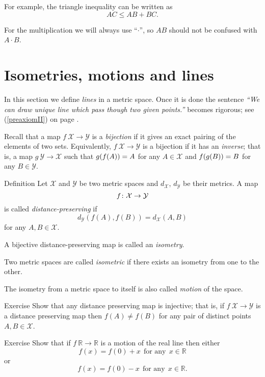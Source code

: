 For example, the triangle inequality can be written as 
$$AC\le AB+BC.$$

For the multiplication we will always use ``$\cdot$'',
so $AB$ should not be confused with $A\cdot B$.

\section*{Isometries, motions and lines}

In this section we define {}\emph{lines} in a metric space.
Once it is done the sentence  {}\emph{``We can draw unique line which pass though two given points.''} becomes rigorous; see (\ref{preaxiomII}) on page \pageref{preaxiomII}. 

Recall that a map $f\:\mathcal{X}\to\mathcal{Y}$
is a \emph{bijection} 
if it gives an exact pairing of the elements of two sets.
Equivalently, $f\:\mathcal{X}\to\mathcal{Y}$ is a bijection if it has an \emph{inverse};
that is, a map $g\:\mathcal{Y}\to\mathcal{X}$
such that 
$g(f(A))\z=A$   for any $A\in\mathcal{X}$
and
$f(g(B))\z=B$ for any $B\in\mathcal{Y}$. 

\begin{thm}{Definition}\label{def:isom}
Let $\mathcal X$ and $\mathcal Y$ be two metric spaces and $d_{\mathcal X}$, $d_{\mathcal Y}$ be their metrics. 
A map 
$$f\:\mathcal X \z\to \mathcal Y$$ 
is
called \emph{distance-preserving} if 
$$d_{\mathcal Y}(f(A), f(B))
 = d_{\mathcal X}(A,B)$$
for any $A,B\in {\mathcal X}$.

A bijective distance-preserving map is called an \emph{isometry}. 

Two metric spaces are called
\emph{isometric} if there exists an isometry from one to the other.

The isometry from a metric space to itself 
is also called \emph{motion} of the space.
\end{thm}

\begin{thm}{Exercise}\label{ex:dist-preserv=>injective}
Show that any distance preserving map  is injective;
that is, if $f\:\mathcal X\to\mathcal Y$ is a distance preserving map then
$f(A)\ne f(B)$
for any pair of distinct points $A,  B\in \mathcal X$.
\end{thm}

\begin{thm}{Exercise}\label{ex:motion-of-R}
Show that if $f\:\mathbb{R}\to\mathbb{R}$ is a motion of the real line 
then either 
$$f(x)=f(0)+x\ \ \text{for any}\ \  x\in \mathbb{R}$$  
or 
$$f(x)=f(0)-x\ \ \text{for any}\ \  x\in \mathbb{R}.$$ 
\end{thm}

